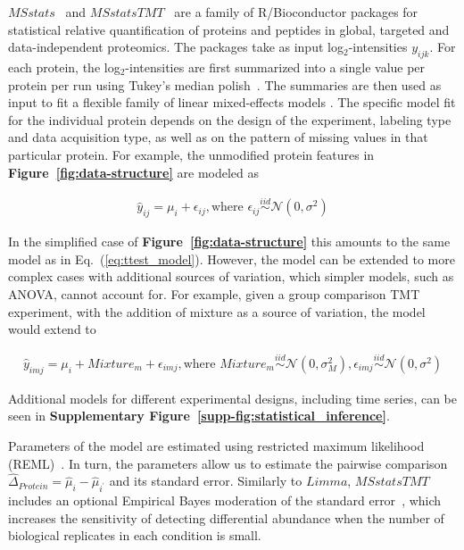 \documentclass[mcp]{article}
\numberwithin{table}{section}
\def\eqref#1{Eq.~(\ref{eq:#1})}
\def\figref#1{{\bf Figure~\ref{fig:#1}}}
\begin{document}
$MSstats$~\cite{Choi:2014} and $MSstatsTMT$~\cite{Huang:2020} are a family of R/Bioconductor packages for statistical relative quantification of proteins and peptides in global, targeted and data-independent proteomics. The packages take as input log$_2$-intensities $y_{ijk}$. For each protein, the log$_2$-intensities are first summarized into a single value per protein per run using Tukey's median polish~\cite{Tukey:1977}. The summaries are then used as input to fit a flexible family of linear mixed-effects models \cite{McLean:1991, Faraway:2006, Bolker2009}. The specific model fit for the individual protein depends on the design of the experiment, labeling type and data acquisition type, as well as on the pattern of missing values in that particular protein. For example, the unmodified protein features in \figref{data-structure} are modeled as

\begin{eqnarray}
\hat{y}_{ij} = \mu_i + \epsilon_{ij}, \text{where } \epsilon_{ij} \stackrel{iid}{\sim} \mathcal{N}(0, \sigma^2)
\label{eq:msstats_model}
\end{eqnarray}

In the simplified case of \figref{data-structure} this amounts to the same model as in \eqref{ttest_model}. However, the model can be extended to more complex cases with additional sources of variation, which simpler models, such as ANOVA, cannot account for. For example, given a group comparison TMT experiment, with the addition of mixture as a source of variation, the model would extend to

\begin{eqnarray}
\hat{y}_{imj} = \mu_i + Mixture_m + \epsilon_{imj}, \text{where } Mixture_m \stackrel{iid}{\sim} \mathcal{N}(0, \sigma_M^2), \epsilon_{imj} \stackrel{iid}{\sim} \mathcal{N}(0, \sigma^2)
\label{eq:msstatstmt_model}
\end{eqnarray}

Additional models for different experimental designs, including time series, can be seen in {\bf Supplementary Figure~\ref{supp-fig:statistical_inference}}.

Parameters of the model are estimated using restricted maximum likelihood (REML)~\cite{Kenward}.
In turn, the parameters allow us to estimate the pairwise comparison $\hat{\Delta}_{Protein} = \hat{\mu}_{i} - \hat{\mu}_{i^{\prime}}$ and its standard error. Similarly to $Limma$, $MSstatsTMT$ includes an optional Empirical Bayes moderation of the standard error~\cite{Huang:2020}, which increases the sensitivity of detecting differential abundance when the number of biological replicates in each condition is small. 
\end{document}
